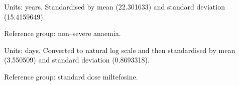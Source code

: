 \begin{table}[tb]
\begin{threeparttable}
\begin{tablenotes}
      \item[3] Units: years. Standardised by mean (22.301633) and standard deviation (15.4159649).
      \item[4] Reference group: non--severe anaemia.
      \item[5] Units: days. Converted to natural log scale and then standardised by mean (3.550509) and standard deviation (0.8693318).
      \item[6] Reference group: standard dose miltefosine.
    \end{tablenotes}
  \end{threeparttable}
  \caption{Model coefficients pooled across 30 imputed datasets using Rubin's Rules. Model \textbf{including} parasite grade. df: degrees of freedom; SDA: single-dose liposomal amphotericin B; std.error: standard error}
  \label{tab:isc_model_coeff_with_pg}
\end{table}